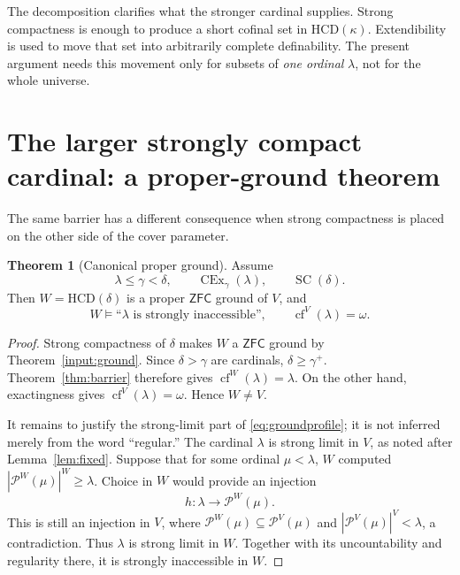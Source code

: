 \documentclass[11pt,letterpaper]{article}
\theoremstyle{definition}
\newtheorem{theorem}[definition]{Theorem}
\newcommand{\ZFC}{\mathsf{ZFC}}
\newcommand{\SC}{\operatorname{SC}}
\newcommand{\CEx}{\operatorname{CEx}}
\newcommand{\cf}{\operatorname{cf}}
\newcommand{\HCD}{\mathrm{HCD}}
\newcommand{\Pow}{\mathcal{P}}
\begin{document}
The decomposition clarifies what the stronger cardinal supplies. Strong compactness is enough to produce a short cofinal set in $\HCD(\kappa)$. Extendibility is used to move that set into arbitrarily complete definability. The present argument needs this movement only for subsets of \emph{one ordinal} $\lambda$, not for the whole universe.

\section{The larger strongly compact cardinal: a proper-ground theorem}\label{sec:above}

The same barrier has a different consequence when strong compactness is placed on the other side of the cover parameter.

\begin{theorem}[Canonical proper ground]\label{thm:ground}
Assume
\begin{equation}\label{eq:upperhyp}
       \lambda\leq\gamma<\delta,\qquad
       \CEx_\gamma(\lambda),\qquad \SC(\delta).
\end{equation}
Then $W=\HCD(\delta)$ is a proper $\ZFC$ ground of $V$, and
\begin{equation}\label{eq:groundprofile}
 W\models\text{``$\lambda$ is strongly inaccessible''},
 \qquad \cf^V(\lambda)=\omega.
\end{equation}
\end{theorem}

\begin{proof}
Strong compactness of $\delta$ makes $W$ a $\ZFC$ ground by Theorem~\ref{input:ground}. Since $\delta>\gamma$ are cardinals, $\delta\geq\gamma^+$. Theorem~\ref{thm:barrier} therefore gives $\cf^W(\lambda)=\lambda$. On the other hand, exactingness gives $\cf^V(\lambda)=\omega$. Hence $W\neq V$.

It remains to justify the strong-limit part of \eqref{eq:groundprofile}; it is not inferred merely from the word ``regular.'' The cardinal $\lambda$ is strong limit in $V$, as noted after Lemma~\ref{lem:fixed}. Suppose that for some ordinal $\mu<\lambda$, $W$ computed $|\Pow^W(\mu)|^W\geq\lambda$. Choice in $W$ would provide an injection
\[
              h:\lambda\longrightarrow\Pow^W(\mu).
\]
This is still an injection in $V$, where $\Pow^W(\mu)\subseteq\Pow^V(\mu)$ and $|\Pow^V(\mu)|^V<\lambda$, a contradiction. Thus $\lambda$ is strong limit in $W$. Together with its uncountability and regularity there, it is strongly inaccessible in $W$.
\end{proof}
\end{document}
